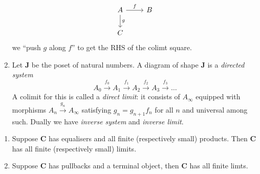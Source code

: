 \documentclass[a4paper]{article}
\renewcommand{\c}[1]{\mathbf{#1}}
\begin{document}
\begin{eg}
\begin{enumerate}
    \[
      \begin{tikzcd}
        A \ar[r, "f"] \ar[d, "g"] & B \\
        C
      \end{tikzcd}
    \]
    we ``push \(g\) along \(f\)'' to get the RHS of the colimt square.
  \item Let \(\c J\) be the poset of natural numbers. A diagram of shape \(\c J\) is a \emph{directed system}
    \[
      A_0 \xrightarrow{f_0} A_1 \xrightarrow{f_1} A_2 \xrightarrow{f_2} A_3 \xrightarrow{f_3} \dots
    \]
    A colimit for this is called a \emph{direct limit}: it consists of \(A_\infty\) equipped with morphisms \(A_n \xrightarrow{g_n} A_\infty\) satisfying \(g_n = g_{n + 1} f_n\) for all \(n\) and universal among such. Dually we have \emph{inverse system} and \emph{inverse limit}.
  \end{enumerate}
\end{eg}

\begin{theorem}\leavevmode
  \label{thm:existence of limits}
  \begin{enumerate}
  \item Suppose \(\c C\) has equalisers and all finite (respectively small) products. Then \(\c C\) has all finite (respectively small) limits.
  \item Suppose \(\c C\) has pullbacks and a terminal object, then \(\c C\) has all finite limts.
  \end{enumerate}
\end{theorem}
\end{document}
